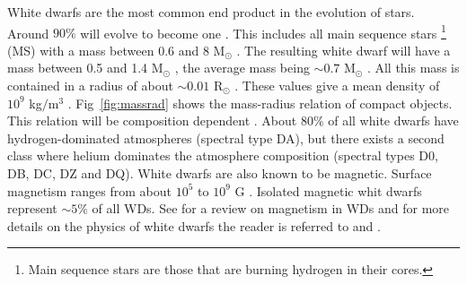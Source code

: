 White dwarfs are the most common end product in the evolution of stars. Around $90 \%$ will evolve to become one \citep{koester_white_1980}. This includes all main sequence stars \footnote{Main sequence stars are those that are burning hydrogen in their cores.} (MS) with a mass between $0.6$ and  $8$ M$_\odot$ \citep{koester_physics_1990}. The resulting white dwarf will have a mass between 0.5 and 1.4 M$_\odot$ \citep{weidemann_revision_2000,chandrasekhar_maximum_1931}, the average mass being $\sim 0.7$ M$_\odot$ \citep{koester_physics_1990}. All this mass is contained in a radius of about $\sim 0.01$ R$_\odot$ \citep{kepler_structure_1995}. These values give a mean density of $10^9$ kg$/$m$^3$ . Fig~\ref{fig:massrad} shows the mass-radius relation of compact objects. This relation will be composition dependent \citep{hamada_models_1961}. About $80 \%$ of all white dwarfs have hydrogen-dominated atmospheres (spectral type DA), but there exists a second class where helium dominates the atmosphere composition (spectral types D0, DB, DC, DZ and DQ)\citep{wickramasinghe_magnetism_2000,koester_physics_1990}. White dwarfs are also known to be magnetic. Surface magnetism ranges from about $10^5$ to $10^9$ G \citep{suh_mass-radius_2000}. Isolated magnetic whit dwarfs represent $\sim 5 \%$ of all WDs. See \cite{wickramasinghe_magnetism_2000} for a review on magnetism in WDs and for more details on the physics of white dwarfs the reader is referred to \cite{koester_physics_1990} and \cite{kepler_structure_1995}.


